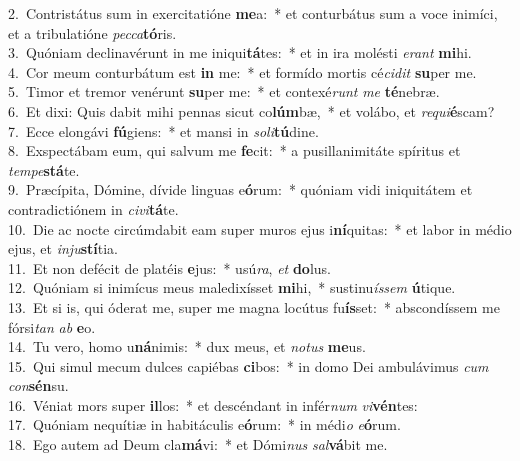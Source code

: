 {2.~}Contristátus sum in exercitatióne \textbf{me}a:~* et conturbátus sum a voce inimíci, et a tribulatióne \textit{pec}\textit{ca}\textbf{tó}ris.\\
{3.~}Quóniam declinavérunt in me iniqui\textbf{tá}tes:~* et in ira molésti \textit{e}\textit{rant} \textbf{mi}hi.\\
{4.~}Cor meum conturbátum est \textbf{in} me:~* et formído mortis cé\textit{ci}\textit{dit} \textbf{su}per me.\\
{5.~}Timor et tremor venérunt \textbf{su}per me:~* et contexé\textit{runt} \textit{me} \textbf{té}nebræ.\\
{6.~}Et dixi: Quis dabit mihi pennas sicut co\textbf{lúm}bæ,~* et volábo, et \textit{re}\textit{qui}\textbf{é}scam?\\
{7.~}Ecce elongávi \textbf{fú}giens:~* et mansi in \textit{so}\textit{li}\textbf{tú}dine.\\
{8.~}Exspectábam eum, qui salvum me \textbf{fe}cit:~* a pusillanimitáte spíritus et \textit{tem}\textit{pe}\textbf{stá}te.\\
{9.~}Præcípita, Dómine, dívide linguas e\textbf{ó}rum:~* quóniam vidi iniquitátem et contradictiónem in \textit{ci}\textit{vi}\textbf{tá}te.\\
{10.~}Die ac nocte circúmdabit eam super muros ejus i\textbf{ní}quitas:~* et labor in médio ejus, et \textit{in}\textit{ju}\textbf{stí}tia.\\
{11.~}Et non defécit de platéis \textbf{e}jus:~* usú\textit{ra}, \textit{et} \textbf{do}lus.\\
{12.~}Quóniam si inimícus meus maledixísset \textbf{mi}hi,~* sustinu\textit{ís}\textit{sem} \textbf{ú}tique.\\
{13.~}Et si is, qui óderat me, super me magna locútus fu\textbf{ís}set:~* abscondíssem me fórsi\textit{tan} \textit{ab} \textbf{e}o.\\
{14.~}Tu vero, homo u\textbf{ná}nimis:~* dux meus, et \textit{no}\textit{tus} \textbf{me}us.\\
{15.~}Qui simul mecum dulces capiébas \textbf{ci}bos:~* in domo Dei ambulávimus \textit{cum} \textit{con}\textbf{sén}su.\\
{16.~}Véniat mors super \textbf{il}los:~* et descéndant in infér\textit{num} \textit{vi}\textbf{vén}tes:\\
{17.~}Quóniam nequítiæ in habitáculis e\textbf{ó}rum:~* in médi\textit{o} \textit{e}\textbf{ó}rum.\\
{18.~}Ego autem ad Deum cla\textbf{má}vi:~* et Dómi\textit{nus} \textit{sal}\textbf{vá}bit me.\\
